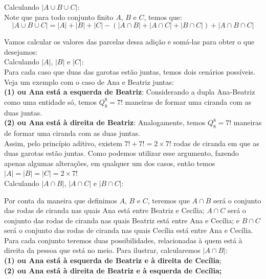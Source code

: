 \documentclass[12pt, a4paper]{article}
\begin{document}
Calculando \(|A \cup B  \cup C|\): \\
Note que para todo conjunto finito \(A\), \(B\) e \(C\), temos que: \[|A \cup B  \cup C| = |A|+|B|+|C| - \left(|A \cap B| + |A \cap C| + |B \cap C|\right)+|A \cap B \cap C|\]

Vamos calcular os valores das parcelas dessa adição e somá-las para obter o que desejamos: \\

Calculando \(|A|\), \(|B|\) e \(|C|\): \\
Para cada caso que duas das garotas estão juntas, temos dois cenários possíveis. Veja um exemplo com o caso de Ana e Beatriz juntas: \\

\textbf{(1) ou Ana está a esquerda de Beatriz}:
Considerando a dupla Ana-Beatriz como uma entidade só, temos \(Q^{8}_{8} = 7!\) maneiras de formar uma ciranda com as duas juntas. \\

\textbf{(2) ou Ana está à direita de Beatriz}:
Analogamente, temos \(Q^8_8 = 7!\) maneiras de formar uma ciranda com as duas juntas. \\

Assim, pelo princípio aditivo, existem \(7! + 7! = 2\times 7!\) rodas de ciranda em que as duas garotas estão juntas. Como podemos utilizar esse argumento, fazendo apenas algumas alterações, em qualquer um dos casos, então temos \(|A| = |B| = |C| = 2\times7!\) \\

Calculando \(|A \cap B|\), \(|A \cap C|\) e \(|B \cap C|\):

Por conta da maneira que definimos \(A\), \(B\) e \(C\), teremos que \(A \cap B\) será o conjunto das rodas de ciranda nas quais Ana está entre Beatriz e Cecília; \(A \cap C\) será o conjunto das rodas de ciranda nas quais Beatriz está entre Ana e Cecília; e \(B \cap C\) será o conjunto das rodas de ciranda nas quais Cecília está entre Ana e Cecília. \\

Para cada conjunto teremos duas possibilidades, relacionadas à quem está à direita da pessoa que está no meio. Para ilustrar, calcularemos \(|A \cap B|\): \\ 

\textbf{(1) ou Ana está à esquerda de Beatriz e à direita de Cecília};\\ \textbf{(2) ou Ana está à direita de Beatriz e à esquerda de Cecília;}\\
\end{document}
